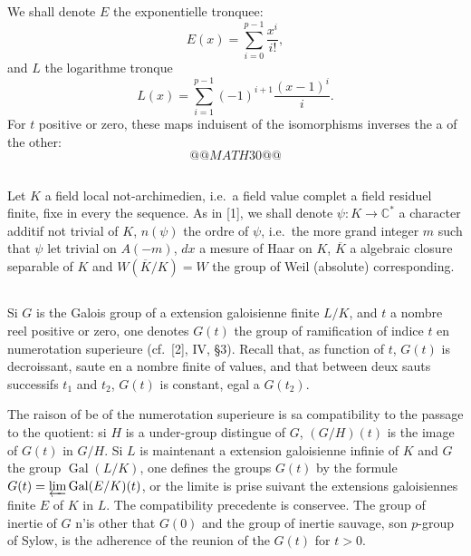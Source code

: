 \documentclass[12pt,a4paper]{article}
\theoremstyle{plain}
\theoremstyle{definition}
\theoremstyle{remark}
\newcommand{\bC}{\mathbb{C}}
\providecommand{\Gal}{\operatorname{Gal}}
\begin{document}
\subsection{}
\label{sec:0.2}

We shall denote $E$ the exponentielle tronquee:
\[
E(x) = \sum_{i=0}^{p-1} \frac{x^i}{i!},
\]
and $L$ the logarithme tronque
\[
L(x) = \sum_{i=1}^{p-1} (-1)^{i+1} \frac{(x-1)^i}{i}.
\]
For $t$ positive or zero, these maps induisent of the isomorphisms inverses the a of the other:
\[
@@MATH30@@
\]

\subsection{}
\label{sec:0.3}

Let $K$ a field local not-archimedien, i.e.~a field value complet a field residuel finite, fixe in every the sequence. As in [1], we shall denote $\psi: K \to \bC^*$ a character additif not trivial of $K$, $n(\psi)$ the ordre of $\psi$, i.e.~the more grand integer $m$ such that $\psi$ let trivial on $A(-m)$, $dx$ a mesure of Haar on $K$, $\overline{K}$ a algebraic closure separable of $K$ and $W(\overline{K}/K) = W$ the group of Weil (absolute) corresponding.

\subsection{}
\label{sec:0.4}

Si $G$ is the Galois group of a extension galoisienne finite $L/K$, and $t$ a nombre reel positive or zero, one denotes $G(t)$ the group of ramification of indice $t$ en numerotation superieure (cf.~[2], IV, \S 3). Recall that, as function of $t$, $G(t)$ is decroissant, saute en a nombre finite of values, and that between deux sauts successifs $t_1$ and $t_2$, $G(t)$ is constant, egal a $G(t_2)$.

The raison of be of the numerotation superieure is sa compatibility to the passage to the quotient: si $H$ is a under-group distingue of $G$, $(G/H)(t)$ is the image of $G(t)$ in $G/H$. Si $L$ is maintenant a extension galoisienne infinie of $K$ and $G$ the group $\Gal(L/K)$, one defines the groups $G(t)$ by the formule $G(t) = \varprojlim \Gal(E/K)(t)$, or the limite is prise suivant the extensions galoisiennes finite $E$ of $K$ in $L$. The compatibility precedente is conservee. The group of inertie of $G$ n'is other that $G(0)$ and the group of inertie sauvage, son $p$-group of Sylow, is the adherence of the reunion of the $G(t)$ for $t > 0$.
\end{document}
